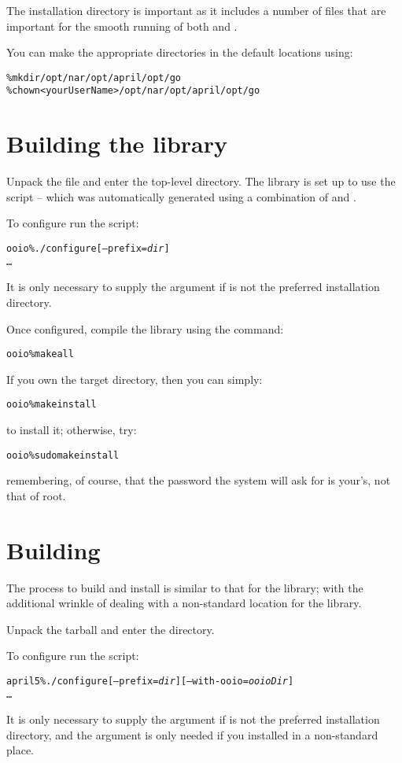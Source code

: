 The installation directory is important as it includes a number of files that are important for the smooth running of both \april and \go.

You can make the appropriate directories in the default locations using:
\begin{alltt}
\% mkdir /opt/nar /opt/april /opt/go
\% chown <yourUserName> /opt/nar /opt/april /opt/go
\end{alltt}

\section{Building the  library}
Unpack the  file and enter the  top-level directory. The  library is set up to use the  script -- which was automatically generated using a combination of  and . 

To configure  run the  script:
\begin{alltt}
ooio \% ./configure [--prefix=\emph{dir}]
\ldots
\end{alltt}
It is only necessary to supply the  argument if  is not the preferred installation directory.

Once configured, compile the library using the  command:
\begin{alltt}
ooio \% make all
\end{alltt}

If you own the target directory, then you can simply:
\begin{alltt}
ooio \% make install
\end{alltt}
to install it; otherwise, try:
\begin{alltt}
ooio \% sudo make install
\end{alltt}
remembering, of course, that the password the system will ask for is your's, not that of root.

\section{Building \april}
The process to build and install \april is similar to that for the  library; with the additional wrinkle of dealing with a non-standard location for the  library.

Unpack the  tarball and enter the  directory. 

To configure \april run the  script:
\begin{alltt}
april5 \% ./configure [--prefix=\emph{dir}] [--with-ooio=\emph{ooioDir}]
\ldots
\end{alltt}
It is only necessary to supply the  argument if  is not the preferred installation directory, and the  argument is only needed if you installed  in a non-standard place.

